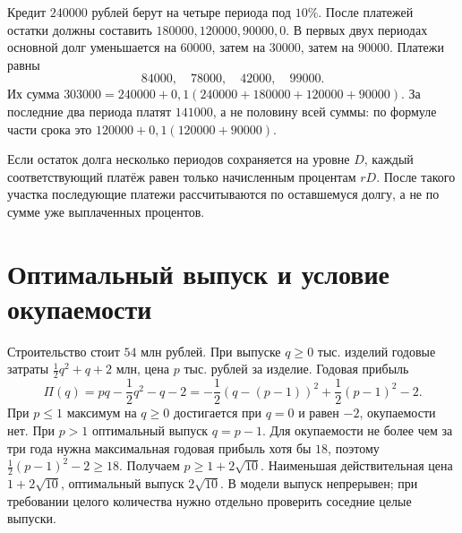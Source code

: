 \begin{example}\label{ex:review-ege-exam-models-2}
Кредит \(240000\) рублей берут на четыре периода под \(10\%\). После платежей остатки должны составить \(180000,120000,90000,0\). В первых двух периодах основной долг уменьшается на \(60000\), затем на \(30000\), затем на \(90000\). Платежи равны
\[
84000,\quad78000,\quad42000,\quad99000.
\]
Их сумма \(303000=240000+0{,}1(240000+180000+120000+90000)\). За последние два периода платят \(141000\), а не половину всей суммы: по формуле части срока это \(120000+0{,}1(120000+90000)\).
\end{example}
Если остаток долга несколько периодов сохраняется на уровне \(D\), каждый соответствующий платёж равен только начисленным процентам \(rD\). После такого участка последующие платежи рассчитываются по оставшемуся долгу, а не по сумме уже выплаченных процентов.

\section{Оптимальный выпуск и условие окупаемости}
\begin{example}\label{ex:review-ege-exam-models-3}
Строительство стоит \(54\) млн рублей. При выпуске \(q\ge0\) тыс. изделий годовые затраты \(\frac12q^2+q+2\) млн, цена \(p\) тыс. рублей за изделие. Годовая прибыль
\[
\Pi(q)=pq-\frac12q^2-q-2
=-\frac12(q-(p-1))^2+\frac12(p-1)^2-2.
\]
При \(p\le1\) максимум на \(q\ge0\) достигается при \(q=0\) и равен \(-2\), окупаемости нет. При \(p>1\) оптимальный выпуск \(q=p-1\). Для окупаемости не более чем за три года нужна максимальная годовая прибыль хотя бы \(18\), поэтому \(\frac12(p-1)^2-2\ge18\). Получаем \(p\ge1+2\sqrt{10}\). Наименьшая действительная цена \(1+2\sqrt{10}\), оптимальный выпуск \(2\sqrt{10}\). В модели выпуск непрерывен; при требовании целого количества нужно отдельно проверить соседние целые выпуски.
\end{example}

